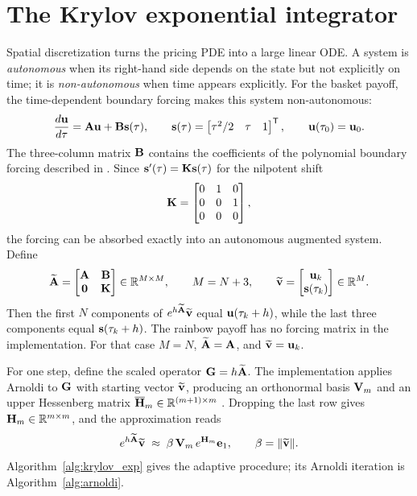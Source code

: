 \section{The Krylov exponential integrator}\label{sec:ksm}

Spatial discretization turns the pricing PDE into a large linear ODE. A system is \emph{autonomous} when its right-hand side depends on the state but not explicitly on time; it is \emph{non-autonomous} when time appears explicitly. For the basket payoff, the time-dependent boundary forcing makes this system non-autonomous:
\begin{equation}
  \frac{d\mathbf{u}}{d\tau}
  = \mathbf{A}\mathbf{u} + \mathbf{B}\mathbf{s}(\tau),
  \qquad
  \mathbf{s}(\tau)=
  \begin{bmatrix}\tau^2/2 & \tau & 1\end{bmatrix}^{\mathsf T},
  \qquad
  \mathbf{u}(\tau_0) = \mathbf{u}_0.
  \label{eq:ode}
\end{equation}
The three-column matrix $\mathbf{B}$ contains the coefficients of the polynomial boundary
forcing described in . Since
$\mathbf{s}'(\tau)=\mathbf{K}\mathbf{s}(\tau)$ for the nilpotent shift
\[
\mathbf{K}=
\begin{bmatrix}
0&1&0\\
0&0&1\\
0&0&0
\end{bmatrix},
\]
the forcing can be absorbed exactly into an autonomous augmented system. Define
\begin{equation}
  \widetilde{\mathbf{A}} =
  \begin{bmatrix} \mathbf{A} & \mathbf{B} \\ \mathbf{0} & \mathbf{K} \end{bmatrix}
  \in \mathbb{R}^{M\times M},
  \qquad
  M=N+3,
  \qquad
  \widetilde{\mathbf{v}} =
  \begin{bmatrix} \mathbf{u}_k \\ \mathbf{s}(\tau_k) \end{bmatrix}
  \in \mathbb{R}^M.
  \label{eq:extended}
\end{equation}
Then the first $N$ components of
$e^{h\widetilde{\mathbf{A}}}\widetilde{\mathbf{v}}$ equal
$\mathbf{u}(\tau_k+h)$, while the last three components equal
$\mathbf{s}(\tau_k+h)$. The rainbow payoff has no forcing matrix in the implementation. For
that case $M=N$, $\widetilde{\mathbf{A}}=\mathbf{A}$, and
$\widetilde{\mathbf{v}}=\mathbf{u}_k$.

For one step, define the scaled operator $\mathbf{G}=h\widetilde{\mathbf{A}}$. The implementation applies Arnoldi to $\mathbf{G}$ with starting vector $\widetilde{\mathbf{v}}$, producing an orthonormal basis $\mathbf{V}_m$ and an upper Hessenberg matrix $\overline{\mathbf{H}}_m \in \mathbb{R}^{(m+1)\times m}$ \cite{saad-1992,hochbruck-lubich-1997}. Dropping the last row gives $\mathbf{H}_m \in \mathbb{R}^{m\times m}$, and the approximation reads
\begin{equation}
  e^{h\widetilde{\mathbf{A}}}\widetilde{\mathbf{v}}
  \;\approx\;
  \beta\, \mathbf{V}_m\, e^{\mathbf{H}_m} \mathbf{e}_1,
  \qquad
  \beta = \|\widetilde{\mathbf{v}}\|.
  \label{eq:krylov_approx}
\end{equation}
Algorithm~\ref{alg:krylov_exp} gives the adaptive procedure; its Arnoldi iteration is Algorithm~\ref{alg:arnoldi}.

